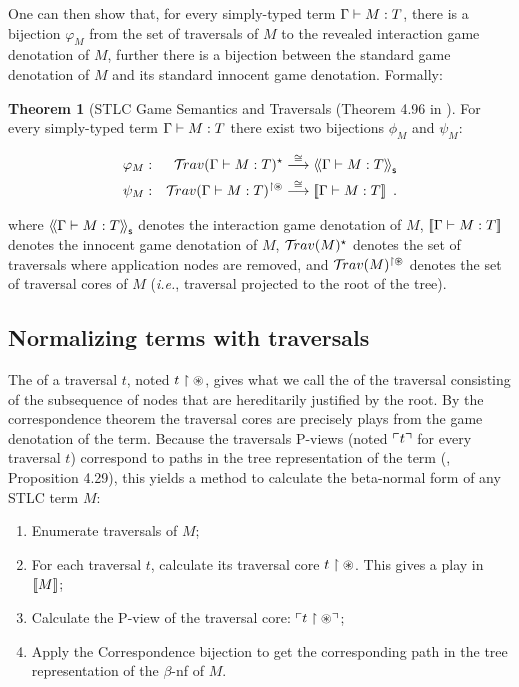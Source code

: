 \documentclass{article}
\makeatletter
\theoremstyle{definition}
\newtheorem{theorem}{Theorem}[section]
\renewcommand\ie{{\it i.e.\@\xspace}}
\makeatother
\begin{document}
One can then show that, for every simply-typed term $\Gamma \vdash M :T$,
there is a bijection $\varphi_M$ from the set of traversals of $M$ to the revealed interaction game denotation of $M$, further there is a bijection between the standard game denotation of $M$ and its standard innocent game denotation. Formally:
\begin{theorem}[STLC Game Semantics and Traversals (Theorem 4.96 in \cite{BlumPhd}]
\label{thm:correspondence}
For every simply-typed term $\Gamma \vdash M :T$ there exist two bijections
$\phi_M$ and $\psi_M$:

\begin{eqnarray*}
 \varphi_M  &:& \mathcal{T}\!rav(\Gamma \vdash M : T)^\star \stackrel{\cong}{\longrightarrow} {\langle\!\langle \Gamma \vdash M :T \rangle\!\rangle}_{\sf s} \\
 \psi_M  &:& \mathcal{T}\!rav(\Gamma \vdash M : T)^{\upharpoonright \circledast} \stackrel{\cong}{\longrightarrow} {[\![ \Gamma \vdash M :T ]\!]} \enspace .
\end{eqnarray*}

where ${\langle\!\langle \Gamma \vdash M : T \rangle\!\rangle}_{\sf s}$ denotes the interaction game denotation of $M$, ${[\![ \Gamma \vdash M : T ]\!]}$ denotes the innocent game denotation of $M$,
$\mathcal{T}\!rav(M)^\star$ denotes the set of traversals where application nodes are removed, and $\mathcal{T}\!rav(M)^{\upharpoonright
\circledast}$ denotes the set of traversal cores of $M$ (\ie, traversal projected to the root of the tree).
\end{theorem}

\subsection{Normalizing terms with traversals}

The  of a traversal $t$, noted $t\upharpoonright {\circledast}$, gives what we call the  of the traversal consisting of the subsequence of nodes that are hereditarily justified by the root. By the correspondence theorem the traversal cores are precisely plays from the game denotation of the term.
Because the traversals P-views (noted $\ulcorner t \urcorner$ for every traversal $t$) correspond to paths in the tree representation of the term (\cite{BlumPhd}, Proposition 4.29), this yields a method to calculate the beta-normal form of any STLC term $M$:
\begin{enumerate}
  \item Enumerate traversals of $M$;
  \item For each traversal $t$, calculate its traversal core $t \upharpoonright \circledast$. This gives a play in ${[\![ M ]\!]}$;
  \item Calculate the P-view of the traversal core: $\ulcorner t\upharpoonright \circledast \urcorner$;
  \item Apply the Correspondence bijection to get the corresponding path in the tree representation of the $\beta$-nf of $M$.
\end{enumerate}
\end{document}
